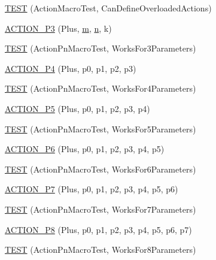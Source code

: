 \begin{DoxyCompactItemize}
\hyperlink{namespacetesting_1_1gmock__generated__actions__test_a8a3d26365bdae172067fe3a63bd88e85}{T\+E\+ST} (Action\+Macro\+Test, Can\+Define\+Overloaded\+Actions)
\item 
\hyperlink{namespacetesting_1_1gmock__generated__actions__test_a35c62beac532eaff7e54b8ad4a7fe1cf}{A\+C\+T\+I\+O\+N\+\_\+\+P3} (Plus, \hyperlink{app_2main_8cpp_a0d2d8836216fc94b61aa0824eb239db2}{m}, \hyperlink{app_2main_8cpp_acfc02ec89670db29251fda6a66602ce2}{n}, k)
\item 
\hyperlink{namespacetesting_1_1gmock__generated__actions__test_a3579cf2428f584d2a837c2c219ec1d5a}{T\+E\+ST} (Action\+Pn\+Macro\+Test, Works\+For3\+Parameters)
\item 
\hyperlink{namespacetesting_1_1gmock__generated__actions__test_ac86e9e1fa5be82823e80247ba093301c}{A\+C\+T\+I\+O\+N\+\_\+\+P4} (Plus, p0, p1, p2, p3)
\item 
\hyperlink{namespacetesting_1_1gmock__generated__actions__test_a6c13e382007960236763d638542bc5fe}{T\+E\+ST} (Action\+Pn\+Macro\+Test, Works\+For4\+Parameters)
\item 
\hyperlink{namespacetesting_1_1gmock__generated__actions__test_a948863fb38d913f02a0c5bde6be0b0a0}{A\+C\+T\+I\+O\+N\+\_\+\+P5} (Plus, p0, p1, p2, p3, p4)
\item 
\hyperlink{namespacetesting_1_1gmock__generated__actions__test_a132cab07373e037a06807a5948b1410b}{T\+E\+ST} (Action\+Pn\+Macro\+Test, Works\+For5\+Parameters)
\item 
\hyperlink{namespacetesting_1_1gmock__generated__actions__test_a97cbcc90a3063a1882886ded61fc8979}{A\+C\+T\+I\+O\+N\+\_\+\+P6} (Plus, p0, p1, p2, p3, p4, p5)
\item 
\hyperlink{namespacetesting_1_1gmock__generated__actions__test_a9031cb5f0e3d9de21ed3ff0a98a311d4}{T\+E\+ST} (Action\+Pn\+Macro\+Test, Works\+For6\+Parameters)
\item 
\hyperlink{namespacetesting_1_1gmock__generated__actions__test_a58bc376a0637fc1e89e6503466d1b9cd}{A\+C\+T\+I\+O\+N\+\_\+\+P7} (Plus, p0, p1, p2, p3, p4, p5, p6)
\item 
\hyperlink{namespacetesting_1_1gmock__generated__actions__test_add3cba52186c7ce384808c222492ee18}{T\+E\+ST} (Action\+Pn\+Macro\+Test, Works\+For7\+Parameters)
\item 
\hyperlink{namespacetesting_1_1gmock__generated__actions__test_ad8766a6dbaeffbf36658d3b5f75d3b00}{A\+C\+T\+I\+O\+N\+\_\+\+P8} (Plus, p0, p1, p2, p3, p4, p5, p6, p7)
\item 
\hyperlink{namespacetesting_1_1gmock__generated__actions__test_a1913bedf1d5cf736e91f2be119de0d5f}{T\+E\+ST} (Action\+Pn\+Macro\+Test, Works\+For8\+Parameters)

\end{DoxyCompactItemize}
